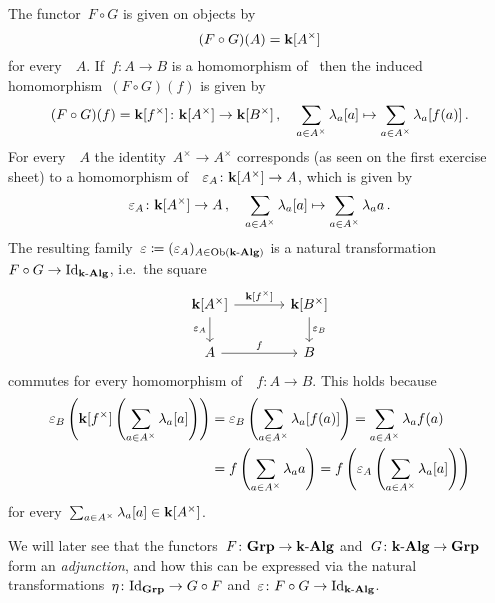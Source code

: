 \begin{example}
  The functor~$F \circ G$ is given on objects by
  \[
      (F \circ G)(A)
    = \mathbf{k}[A^\times]
  \]
  for every~{\kalg}~$A$.
  If~$f \colon A \to B$ is a homomorphism of~{\kalgs} then the induced~{\kalg} homomorphism~$(F \circ G)(f)$ is given by
  \[
            (F \circ G)(f)
    =       \mathbf{k}[f^\times]
    \colon  \mathbf{k}[A^\times]
    \to     \mathbf{k}[B^\times] \,,
    \quad   \sum_{a \in A^\times} \lambda_a [a]
    \mapsto \sum_{a \in A^\times} \lambda_a [f(a)] \,.
  \]
  For every~{\kalg}~$A$ the identity~$A^\times \to A^\times$ corresponds (as seen on the first exercise sheet) to a homomorphism of~{\kalg}~$\varepsilon_A \colon \mathbf{k}[A^\times] \to A$, which is given by
  \[
            \varepsilon_A
    \colon  \mathbf{k}[A^\times]
    \to     A \,,
    \quad   \sum_{a \in A^\times} \lambda_a [a]
    \mapsto \sum_{a \in A^\times} \lambda_a a \,.
  \]
  The resulting family~$\varepsilon \coloneqq (\varepsilon_A)_{A \in \operatorname{Ob}(\text{$\mathbf{k}$-$\mathbf{Alg}$})}$ is a natural transformation~$F \circ G \to \mathrm{Id}_{\text{$\mathbf{k}$-$\mathbf{Alg}$}}$, i.e.\ the square
  \[
    \begin{tikzcd}[column sep = large]
        \kf[A^\times]
        \arrow{r}[above]{\kf[f^\times]}
        \arrow{d}[left]{\varepsilon_A}
      & \kf[B^\times]
        \arrow{d}[right]{\varepsilon_B}
      \\
        A
        \arrow{r}[above]{f}
      & B
    \end{tikzcd}
  \]
  commutes for every homomorphism of~{\kalgs}~$f \colon A \to B$.
  This holds because
  \begin{align*}
        \varepsilon_B\left( \mathbf{k}[f^\times]\left( \sum_{a \in A^\times} \lambda_a [a] \right) \right)
    &=  \varepsilon_B\left( \sum_{a \in A^\times} \lambda_a [f(a)] \right)
     =  \sum_{a \in A^\times} \lambda_a f(a)  \\
    &=  f\left( \sum_{a \in A^\times} \lambda_a a \right)
     =  f\left( \varepsilon_A\left( \sum_{a \in A^\times} \lambda_a [a] \right) \right)
  \end{align*}
  for every~$\sum_{a \in A^\times} \lambda_a [a] \in \mathbf{k}[A^\times]$.
  
  We will later see that the functors~$F \colon \mathbf{Grp} \to \text{$\mathbf{k}$-$\mathbf{Alg}$}$ and~$G \colon \text{$\mathbf{k}$-$\mathbf{Alg}$} \to \mathbf{Grp}$ form an \emph{adjunction}, and how this can be expressed via the natural transformations~$\eta \colon \mathrm{Id}_{\mathbf{Grp}} \to G \circ F$ and~$\varepsilon \colon F \circ G \to \mathrm{Id}_{\text{$\mathbf{k}$-$\mathbf{Alg}$}}$.
\end{example}










